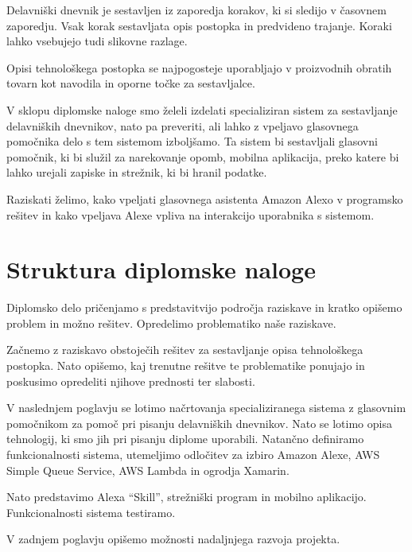 \documentclass[a4paper, 12pt]{book}
\begin{document}
Delavniški dnevnik je sestavljen iz zaporedja korakov, ki si sledijo v časovnem zaporedju.
Vsak korak sestavljata opis postopka in predvideno trajanje.
Koraki lahko vsebujejo tudi slikovne razlage.

Opisi tehnološkega postopka se najpogosteje uporabljajo v proizvodnih obratih tovarn kot navodila in oporne točke za sestavljalce.

V sklopu diplomske naloge smo želeli izdelati specializiran sistem za sestavljanje delavniških dnevnikov, nato pa preveriti, ali lahko z vpeljavo glasovnega pomočnika delo s tem sistemom izboljšamo.
Ta sistem bi sestavljali glasovni pomočnik, ki bi služil za narekovanje opomb, mobilna aplikacija, preko katere bi lahko urejali zapiske in strežnik, ki bi hranil podatke.

Raziskati želimo, kako vpeljati glasovnega asistenta Amazon Alexo v programsko rešitev in kako vpeljava Alexe vpliva na interakcijo uporabnika s sistemom.


\section{Struktura diplomske naloge}

Diplomsko delo pričenjamo s predstavitvijo področja raziskave in kratko opišemo problem in možno rešitev. 
Opredelimo problematiko naše raziskave.

Začnemo z raziskavo obstoječih rešitev za sestavljanje opisa tehnološkega postopka.
Nato opišemo, kaj trenutne rešitve te problematike ponujajo in poskusimo opredeliti njihove prednosti ter slabosti.

V naslednjem poglavju se lotimo načrtovanja specializiranega sistema z glasovnim pomočnikom za pomoč pri pisanju delavniških dnevnikov.
Nato se lotimo opisa tehnologij, ki smo jih pri pisanju diplome uporabili.
Natančno definiramo funkcionalnosti sistema, utemeljimo odločitev za izbiro Amazon Alexe, AWS Simple Queue Service, AWS Lambda in ogrodja Xamarin.

Nato predstavimo Alexa \enquote{Skill}, strežniški program in mobilno aplikacijo.
Funkcionalnosti sistema testiramo.

V zadnjem poglavju opišemo možnosti nadaljnjega razvoja projekta.
\end{document}
